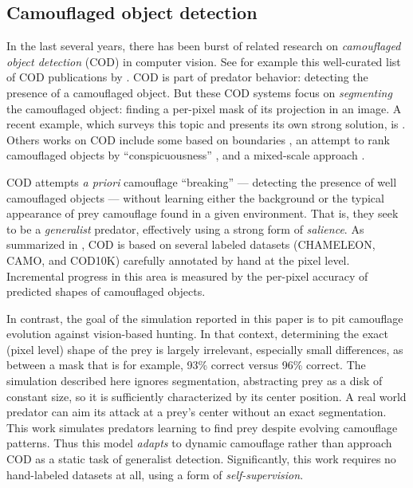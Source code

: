 \documentclass[sigconf]{acmart}
\newcommand{\jargon}[1]{\textit{#1}}
\begin{document}
\subsection{Camouflaged object detection}
In the last several years, there has been burst of related research on \jargon{camouflaged object detection} (COD) in computer vision. See for example this well-curated list of COD publications by \citet{visionxiang_cod}. COD is part of predator behavior: detecting the presence of a camouflaged object. But these COD systems focus on \jargon{segmenting} the camouflaged object: finding a per-pixel mask of its projection in an image. A recent example, which surveys this topic and presents its own strong solution, is \citet{Zhang2022}. Others works on COD include some based on boundaries \cite{chen_boundary-guided_2022} \cite{sun_boundary-guided_2022}, an attempt to rank camouflaged objects by “conspicuousness” \cite{lv_cod_2022}, and a mixed-scale approach \cite{pang_zoom_2022}.
\par
COD attempts \textit{a priori} camouflage “breaking” — detecting the presence of well camouflaged objects — without learning either the background or the typical appearance of prey camouflage found in a given environment. That is, they seek to be a \jargon{generalist} predator, effectively using a strong form of \jargon{salience}. As summarized in \citet{Zhang2022}, COD is based on several labeled datasets (CHAMELEON, CAMO, and COD10K) carefully annotated by hand at the pixel level. Incremental progress in this area is measured by the per-pixel accuracy of predicted shapes of camouflaged objects.
\par
In contrast, the goal of the simulation reported in this paper is to pit camouflage evolution against vision-based hunting. In that context, determining the exact (pixel level) shape of the prey is largely irrelevant, especially small differences, as between a mask that is for example, 93\% correct versus 96\% correct. The simulation described here ignores segmentation, abstracting prey as a disk of constant size, so it is sufficiently characterized by its center position. A real world predator can aim its attack at a prey's center without an exact segmentation. This work simulates predators learning to find prey despite evolving camouflage patterns. Thus this model \jargon{adapts} to dynamic camouflage rather than approach COD as a static task of generalist detection. Significantly, this work requires no hand-labeled datasets at all, using a form of \jargon{self-supervision}.
\par
\end{document}

